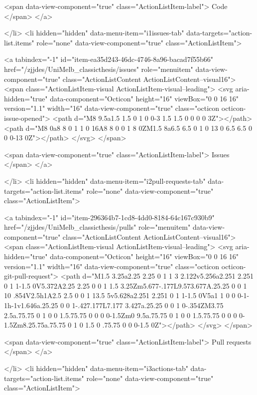         <span data-view-component="true" class="ActionListItem-label">
          Code
</span>      
</a>
  
</li>
        <li hidden="hidden" data-menu-item="i1issues-tab" data-targets="action-list.items" role="none" data-view-component="true" class="ActionListItem">
    
    
    <a tabindex="-1" id="item-ea35d243-46dc-4746-8a96-bacad7f55b66" href="/zjjdes/UniMelb_classicthesis/issues" role="menuitem" data-view-component="true" class="ActionListContent ActionListContent--visual16">
        <span class="ActionListItem-visual ActionListItem-visual--leading">
          <svg aria-hidden="true" data-component="Octicon" height="16" viewBox="0 0 16 16" version="1.1" width="16" data-view-component="true" class="octicon octicon-issue-opened">
    <path d="M8 9.5a1.5 1.5 0 1 0 0-3 1.5 1.5 0 0 0 0 3Z"></path><path d="M8 0a8 8 0 1 1 0 16A8 8 0 0 1 8 0ZM1.5 8a6.5 6.5 0 1 0 13 0 6.5 6.5 0 0 0-13 0Z"></path>
</svg>
        </span>
      
        <span data-view-component="true" class="ActionListItem-label">
          Issues
</span>      
</a>
  
</li>
        <li hidden="hidden" data-menu-item="i2pull-requests-tab" data-targets="action-list.items" role="none" data-view-component="true" class="ActionListItem">
    
    
    <a tabindex="-1" id="item-296364b7-1cd8-4dd0-8184-64c167c930b9" href="/zjjdes/UniMelb_classicthesis/pulls" role="menuitem" data-view-component="true" class="ActionListContent ActionListContent--visual16">
        <span class="ActionListItem-visual ActionListItem-visual--leading">
          <svg aria-hidden="true" data-component="Octicon" height="16" viewBox="0 0 16 16" version="1.1" width="16" data-view-component="true" class="octicon octicon-git-pull-request">
    <path d="M1.5 3.25a2.25 2.25 0 1 1 3 2.122v5.256a2.251 2.251 0 1 1-1.5 0V5.372A2.25 2.25 0 0 1 1.5 3.25Zm5.677-.177L9.573.677A.25.25 0 0 1 10 .854V2.5h1A2.5 2.5 0 0 1 13.5 5v5.628a2.251 2.251 0 1 1-1.5 0V5a1 1 0 0 0-1-1h-1v1.646a.25.25 0 0 1-.427.177L7.177 3.427a.25.25 0 0 1 0-.354ZM3.75 2.5a.75.75 0 1 0 0 1.5.75.75 0 0 0 0-1.5Zm0 9.5a.75.75 0 1 0 0 1.5.75.75 0 0 0 0-1.5Zm8.25.75a.75.75 0 1 0 1.5 0 .75.75 0 0 0-1.5 0Z"></path>
</svg>
        </span>
      
        <span data-view-component="true" class="ActionListItem-label">
          Pull requests
</span>      
</a>
  
</li>
        <li hidden="hidden" data-menu-item="i3actions-tab" data-targets="action-list.items" role="none" data-view-component="true" class="ActionListItem">
    
